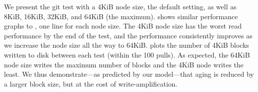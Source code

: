 We present the git test with a 4KiB node size, the default setting, as well as 8KiB,
16KiB, 32KiB, and 64KiB (the maximum).  
 shows similar
performance graphs to , one line for each node size.  The 4KiB
node size has the worst read performance by the end of the test, and the
performance consistently improves as we increase the node size all the way to
64KiB.   plots the number
of 4KiB blocks written to disk between each test (within the 100 pulls).  As
expected, the 64KiB node size writes the maximum number of blocks and the 4KiB
node writes the least.  We thus demonstrate---as predicted by our model---that
aging is reduced by a larger block size, but at the cost of write-amplification.


